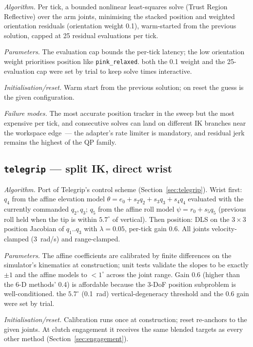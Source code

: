 \emph{Algorithm.} Per tick, a bounded nonlinear least-squares solve
(Trust Region Reflective) over the arm joints, minimising the stacked
position and weighted orientation residuals (orientation weight 0.1),
warm-started from the previous solution, capped at 25 residual
evaluations per tick.

\emph{Parameters.} The evaluation cap bounds the per-tick latency; the
low orientation weight prioritises position like
\texttt{pink\_relaxed}. \unjustified{} both the 0.1 weight
and the 25-evaluation cap were set by trial to keep solve times
interactive.

\emph{Initialisation/reset.} Warm start from the previous solution; on
reset the guess is the given configuration.

\emph{Failure modes.} The most accurate position tracker in the sweep
but the most expensive per tick, and consecutive solves can land on
different IK branches near the workspace edge~--- the adapter's rate
limiter is mandatory, and residual jerk remains the highest of the QP
family.

\subsection{\texttt{telegrip} — split IK, direct wrist}
\label{app:telegrip}

\emph{Algorithm.} Port of Telegrip's control scheme
(Section~\ref{sec:telegrip}). Wrist first: \(q_4\) from the affine
elevation model \(\theta = e_0 + s_2 q_2 + s_3 q_3 + s_4 q_4\) evaluated
with the currently commanded \(q_2, q_3\); \(q_5\) from the affine roll
model \(\psi = r_0 + s_5 q_5\) (previous roll held when the tip is
within \(5.7^\circ\) of vertical). Then position: DLS on the
\(3\times3\) position Jacobian of \(q_1..q_3\) with \(\lambda=0.05\),
per-tick gain 0.6. All joints velocity-clamped (3~rad/s) and
range-clamped.

\emph{Parameters.} The affine coefficients are calibrated by finite
differences on the simulator's kinematics at construction; unit tests
validate the slopes to be exactly \(\pm1\) and the affine models to
\(<1^\circ\) across the joint range. Gain 0.6 (higher than the 6-D
methods' 0.4) is affordable because the 3-DoF position subproblem is
well-conditioned. \unjustified{} the \(5.7^\circ\)
(0.1~rad) vertical-degeneracy threshold and the 0.6 gain were set by
trial.

\emph{Initialisation/reset.} Calibration runs once at construction;
reset re-anchors to the given joints. At clutch engagement it receives
the same blended targets as every other method
(Section~\ref{sec:engagement}).

